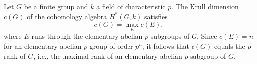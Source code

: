 Let $G$ be a finite group and $k$ a field of characteristic $p$. The Krull dimension $c(G)$ of the cohomology algebra $H^*(G, k)$ satisfies
\[
c(G) = \max_{E} c(E),
\]
where $E$ runs through the elementary abelian $p$-subgroups of $G$. Since $c(E) = n$ for an elementary abelian $p$-group of order $p^n$, it follows that $c(G)$ equals the $p$-rank of $G$, i.e., the maximal rank of an elementary abelian $p$-subgroup of $G$.
